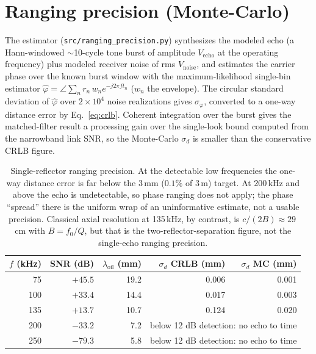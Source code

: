 \section{Ranging precision (Monte-Carlo)}\label{app:precision}
The estimator (\texttt{src/ranging\_precision.py}) synthesizes the modeled echo (a Hann-windowed
$\sim$10-cycle tone burst of amplitude $V_{\mathrm{echo}}$ at the operating frequency) plus modeled
receiver noise of rms $V_{\mathrm{noise}}$, and estimates the carrier phase over the known burst
window with the maximum-likelihood single-bin estimator $\hat\varphi=\angle\sum_n r_n\,w_n e^{-j2\pi f t_n}$
($w_n$ the envelope). The circular standard deviation of $\hat\varphi$ over $2\times10^4$ noise
realizations gives $\sigma_\varphi$, converted to a one-way distance error by
Eq.~\eqref{eq:crlb}. Coherent integration over the burst gives the matched-filter result a
processing gain over the single-look bound computed from the narrowband link SNR, so the
Monte-Carlo $\sigma_d$ is smaller than the conservative CRLB figure.

\begin{table}[h]
\centering\small
\begin{tabular}{rrrrr}
\toprule
$f$ (kHz) & SNR (dB) & $\lambda_{\mathrm{oil}}$ (mm) & $\sigma_d$ CRLB (mm) & $\sigma_d$ MC (mm) \\
\midrule
75  & $+45.5$ & 19.2 & 0.006 & 0.001 \\
100 & $+33.4$ & 14.4 & 0.017 & 0.003 \\
135 & $+13.7$ & 10.7 & 0.124 & 0.020 \\
200 & $-33.2$ & 7.2  & \multicolumn{2}{c}{below 12 dB detection: no echo to time} \\
250 & $-79.3$ & 5.8  & \multicolumn{2}{c}{below 12 dB detection: no echo to time} \\
\bottomrule
\end{tabular}
\caption{Single-reflector ranging precision. At the detectable low frequencies the one-way
distance error is far below the 3\,mm ($0.1\%$ of 3\,m) target. At 200\,kHz and above the echo
is undetectable, so phase ranging does not apply; the phase ``spread'' there is the uniform
wrap of an uninformative estimate, not a usable precision. Classical axial resolution at
135\,kHz, by contrast, is $c/(2B)\approx 29$\,cm with $B=f_0/Q$, but that is the
two-reflector-separation figure, not the single-echo ranging precision.}
\end{table}

